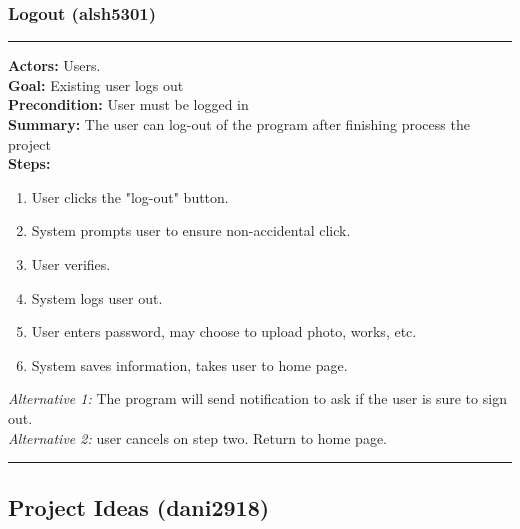 \documentclass[11pt]{report}
\begin{document}
\subsubsection{Logout (alsh5301)}
\vspace{2pt}
\hrule
\vspace{8pt}
 \textbf{Actors:} Users. \\ 
  \textbf{Goal:} Existing user logs out \\ 
 \textbf{Precondition:} User must be logged in \\
 \textbf{Summary:}  The user can log-out of the program after finishing process the project  \\
 \textbf{Steps:} \begin{enumerate}
 \item User clicks the "log-out" button. 
 \item System prompts user to ensure non-accidental click. 
 \item User verifies. 
 \item System logs user out. 
 \item User enters password, may choose to upload photo, works, etc. 
 \item System saves information, takes user to home page.
 \end{enumerate}
  \textit{Alternative 1:} The program will send notification to ask if the user is sure to sign out. \\
  \textit{Alternative 2:} user cancels on step two. Return to home page. \\ 
 \vspace{8pt}
\hrule
\newpage
\subsection{Project Ideas (dani2918)}
\end{document}
